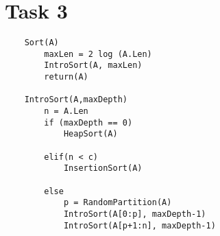 \section{Task 3}

\begin{verbatim}
    Sort(A)
        maxLen = 2 log (A.Len)
        IntroSort(A, maxLen)
        return(A)
	
    IntroSort(A,maxDepth)
        n = A.Len
        if (maxDepth == 0)
            HeapSort(A)
				
        elif(n < c)
            InsertionSort(A)
		
        else
            p = RandomPartition(A)
            IntroSort(A[0:p], maxDepth-1)
            IntroSort(A[p+1:n], maxDepth-1)
\end{verbatim}
